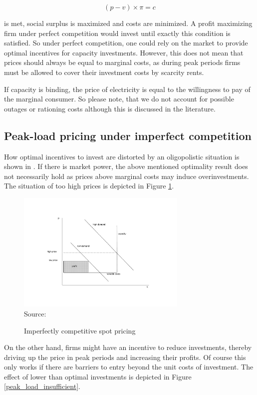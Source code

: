$$(p-v)\times\pi=c$$

is met, social surplus is maximized and costs are minimized. A profit maximizing firm under perfect competition would invest until exactly this condition is satisfied. So under perfect competition, one could rely on the market to provide optimal incentives for capacity investments. However, this does not mean that prices should always be equal to marginal costs, as during peak periods firms must be allowed to cover their investment costs by scarcity rents.

If capacity is binding, the price of electricity is equal to the willingness to pay of the marginal consumer. So please note, that we do not account for possible outages or rationing costs although this is discussed in the literature.

\subsection{Peak-load pricing under imperfect competition}

How optimal incentives to invest are distorted by an oligopolistic situation is shown in \cite{Fehr1995}. If there is market power, the above mentioned optimality result does not necessarily hold as prices above marginal costs may induce overinvestments. The situation of too high prices is depicted in Figure \ref{peak_load_toohigh}.

\begin{figure}[h]
\centering
\caption{Imperfectly competitive spot pricing}
\includegraphics[width=3.2in]{capacity/imperfect_spot_pricing}
      \label{peak_load_toohigh}  
\\          
\scriptsize Source: \cite{Fehr1995}
\end{figure}

On the other hand, firms might have an incentive to reduce investments, thereby driving up the price in peak periods and increasing their profits. Of course this only works if there are barriers to entry beyond the unit costs of investment. The effect of lower than optimal investments is depicted in Figure \ref{peak_load_insufficient}.

